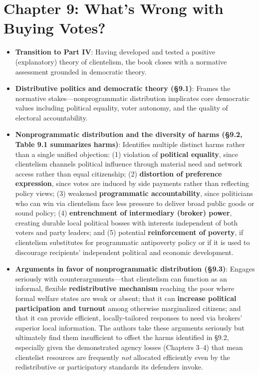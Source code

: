 \documentclass[12pt]{article}
\begin{document}
\section{Chapter 9: What's Wrong with Buying Votes?}

\begin{itemize}[leftmargin=*, itemsep=4pt]
    \item \textbf{Transition to Part IV}: Having developed and tested a positive (explanatory) theory of clientelism, the book closes with a normative assessment grounded in democratic theory.
    \item \textbf{Distributive politics and democratic theory (\S9.1)}: Frames the normative stakes---nonprogrammatic distribution implicates core democratic values including political equality, voter autonomy, and the quality of electoral accountability.
    \item \textbf{Nonprogrammatic distribution and the diversity of harms (\S9.2, Table 9.1 summarizes harms)}: Identifies multiple distinct harms rather than a single unified objection: (1) violation of \textbf{political equality}, since clientelism channels political influence through material need and network access rather than equal citizenship; (2) \textbf{distortion of preference expression}, since votes are induced by side payments rather than reflecting policy views; (3) weakened \textbf{programmatic accountability}, since politicians who can win via clientelism face less pressure to deliver broad public goods or sound policy; (4) \textbf{entrenchment of intermediary (broker) power}, creating durable local political bosses with interests independent of both voters and party leaders; and (5) potential \textbf{reinforcement of poverty}, if clientelism substitutes for programmatic antipoverty policy or if it is used to discourage recipients' independent political and economic development.
    \item \textbf{Arguments in favor of nonprogrammatic distribution (\S9.3)}: Engages seriously with counterarguments---that clientelism can function as an informal, flexible \textbf{redistributive mechanism} reaching the poor where formal welfare states are weak or absent; that it can \textbf{increase political participation and turnout} among otherwise marginalized citizens; and that it can provide efficient, locally-tailored responses to need via brokers' superior local information. The authors take these arguments seriously but ultimately find them insufficient to offset the harms identified in \S9.2, especially given the demonstrated agency losses (Chapters 3--4) that mean clientelist resources are frequently \emph{not} allocated efficiently even by the redistributive or participatory standards its defenders invoke.

\end{itemize}
\end{document}
